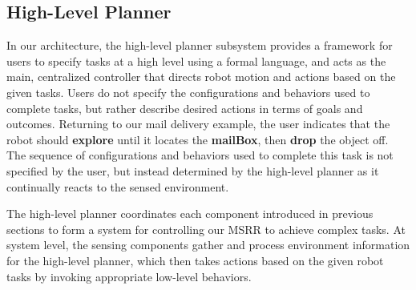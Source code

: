 \documentclass[journal]{IEEEtran}
\begin{document}
\subsection{High-Level Planner}
\label{sec:high-level}
In our architecture, the high-level planner subsystem provides a framework for users to specify tasks  at a high level using a formal language, and acts as the main, centralized controller that directs robot motion and actions based on the given tasks.  Users do not specify the configurations and behaviors used to complete tasks, but rather describe desired actions in terms of goals and outcomes.  Returning to our mail delivery example, the user indicates that the robot should \textbf{explore} until it locates the \textbf{mailBox}, then \textbf{drop} the object off.  The sequence of configurations and behaviors used to complete this task is not specified by the user, but instead determined by the high-level planner as it continually reacts to the sensed environment.

The high-level planner coordinates each component introduced in previous sections to form a system for controlling our MSRR to achieve complex tasks.
At system level, the sensing components gather and process environment information for the high-level planner, which then takes actions based on the given robot tasks by invoking appropriate low-level behaviors.
\end{document}
